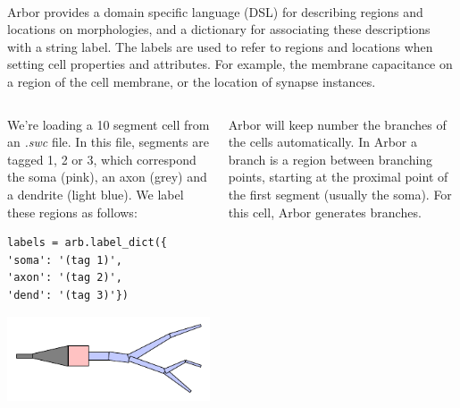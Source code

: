\documentclass{beamer}
\newcommand*\circled[1]{\tikz[baseline=(char.base)]{\node[shape=circle,fill,inner sep=2pt] (char) {\textcolor{white}{#1}};}} %
\begin{document}
\begin{frame}[t, fragile]
  \textbf{}\\
      Arbor provides a domain specific language (DSL) for describing regions and locations on morphologies, and a dictionary for associating these descriptions with a string label. The labels are used to refer to regions and locations when setting cell properties and attributes. For example, the membrane capacitance on a region of the cell membrane, or the location of synapse instances.
      \newline

      \begin{columns}[onlytextwidth,T]

        \begin{column}{0.33\textwidth}
          \circled{1} We're loading a 10 segment cell from an \emph{.swc} file. In this file, segments are tagged 1, 2 or 3, which correspond the soma (pink), an axon (grey) and a dendrite (light blue). We label these regions as follows:
\begin{verbatim}
labels = arb.label_dict({
'soma': '(tag 1)',
'axon': '(tag 2)',
'dend': '(tag 3)'})
\end{verbatim}
          \begin{center}\includegraphics[width=0.8\linewidth]{scripts/morph.pdf}\end{center}
        \end{column}

        \begin{column}{0.33\textwidth}
          \circled{2} Arbor will keep number the branches of the cells automatically. In Arbor a branch is a region between branching points, starting at the proximal point {\color{red}\circled{-}} of the first segment (usually the soma). For this cell, Arbor generates {\color{mediumslateblue}\circled{6}} branches.
          \newline
          

\end{column}
\end{columns}
\end{frame}
\end{document}
